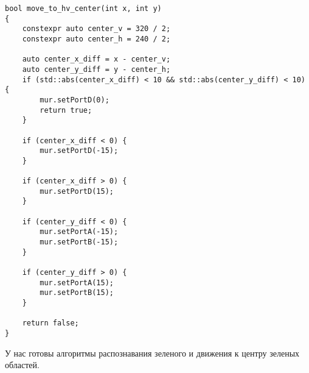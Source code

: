 \begin{verbatim}
bool move_to_hv_center(int x, int y)
{
    constexpr auto center_v = 320 / 2;
    constexpr auto center_h = 240 / 2;

    auto center_x_diff = x - center_v;
    auto center_y_diff = y - center_h;
    if (std::abs(center_x_diff) < 10 && std::abs(center_y_diff) < 10) {
        mur.setPortD(0);
        return true;
    }

    if (center_x_diff < 0) {
        mur.setPortD(-15);
    }

    if (center_x_diff > 0) {
        mur.setPortD(15);
    }

    if (center_y_diff < 0) {
        mur.setPortA(-15);
        mur.setPortB(-15);
    }

    if (center_y_diff > 0) {
        mur.setPortA(15);
        mur.setPortB(15);
    }

    return false;
}
\end{verbatim}

У нас готовы алгоритмы распознавания зеленого и движения к центру зеленых областей.

